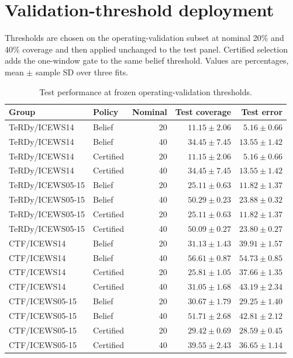 \section{Validation-threshold deployment}
Thresholds are chosen on the operating-validation subset at nominal 20\% and 40\% coverage and then applied unchanged to the test panel. Certified selection adds the one-window gate to the same belief threshold. Values are percentages, mean $\pm$ sample SD over three fits.
\small\begin{longtable}{llrrr}\caption{Test performance at frozen operating-validation thresholds.}\\\toprule Group & Policy & Nominal & Test coverage & Test error\\\midrule\endhead
TeRDy/ICEWS14 & Belief & 20 & $11.15\pm2.06$ & $5.16\pm0.66$\\
TeRDy/ICEWS14 & Belief & 40 & $34.45\pm7.45$ & $13.55\pm1.42$\\
TeRDy/ICEWS14 & Certified & 20 & $11.15\pm2.06$ & $5.16\pm0.66$\\
TeRDy/ICEWS14 & Certified & 40 & $34.45\pm7.45$ & $13.55\pm1.42$\\
TeRDy/ICEWS05-15 & Belief & 20 & $25.11\pm0.63$ & $11.82\pm1.37$\\
TeRDy/ICEWS05-15 & Belief & 40 & $50.29\pm0.23$ & $23.88\pm0.32$\\
TeRDy/ICEWS05-15 & Certified & 20 & $25.11\pm0.63$ & $11.82\pm1.37$\\
TeRDy/ICEWS05-15 & Certified & 40 & $50.09\pm0.27$ & $23.80\pm0.27$\\
CTF/ICEWS14 & Belief & 20 & $31.13\pm1.43$ & $39.91\pm1.57$\\
CTF/ICEWS14 & Belief & 40 & $56.61\pm0.87$ & $54.73\pm0.85$\\
CTF/ICEWS14 & Certified & 20 & $25.81\pm1.05$ & $37.66\pm1.35$\\
CTF/ICEWS14 & Certified & 40 & $31.05\pm1.68$ & $43.19\pm2.34$\\
CTF/ICEWS05-15 & Belief & 20 & $30.67\pm1.79$ & $29.25\pm1.40$\\
CTF/ICEWS05-15 & Belief & 40 & $51.71\pm2.68$ & $42.81\pm2.12$\\
CTF/ICEWS05-15 & Certified & 20 & $29.42\pm0.69$ & $28.59\pm0.45$\\
CTF/ICEWS05-15 & Certified & 40 & $39.55\pm2.43$ & $36.65\pm1.14$\\
\bottomrule\end{longtable}\normalsize
